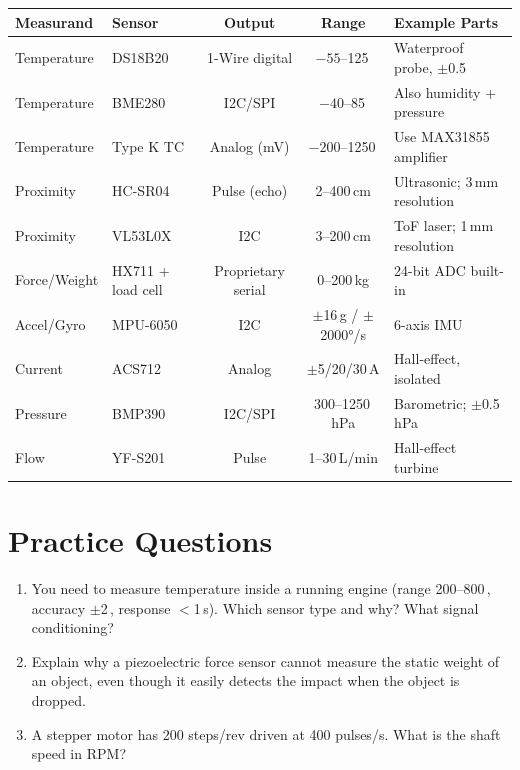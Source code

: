 \begin{quickrefbox}
\begin{table}[H]\centering\small
\begin{tabularx}{\linewidth}{l l c c X}
\toprule
\textbf{Measurand} & \textbf{Sensor} & \textbf{Output} & \textbf{Range} & \textbf{Example Parts} \\
\midrule
Temperature & DS18B20 & 1-Wire digital & $-55$--125\,\degC{} & Waterproof probe, $\pm$0.5\,\degC{} \\
Temperature & BME280 & I2C/SPI & $-40$--85\,\degC{} & Also humidity + pressure \\
Temperature & Type K TC & Analog (mV) & $-200$--1250\,\degC{} & Use MAX31855 amplifier \\
Proximity & HC-SR04 & Pulse (echo) & 2--400\,cm & Ultrasonic; 3\,mm resolution \\
Proximity & VL53L0X & I2C & 3--200\,cm & ToF laser; 1\,mm resolution \\
Force/Weight & HX711 + load cell & Proprietary serial & 0--200\,kg & 24-bit ADC built-in \\
Accel/Gyro & MPU-6050 & I2C & $\pm$16\,g / $\pm$\ang{2000}/s & 6-axis IMU \\
Current & ACS712 & Analog & $\pm$5/20/30\,A & Hall-effect, isolated \\
Pressure & BMP390 & I2C/SPI & 300--1250\,hPa & Barometric; $\pm$0.5\,hPa \\
Flow & YF-S201 & Pulse & 1--30\,L/min & Hall-effect turbine \\
\bottomrule
\end{tabularx}
\end{table}
\end{quickrefbox}

\section{Practice Questions}
\begin{enumerate}[leftmargin=1.5em]
\item You need to measure temperature inside a running engine (range 200--800\,\degC{}, accuracy $\pm$2\,\degC{}, response $<$1\,s). Which sensor type and why? What signal conditioning?
\item Explain why a piezoelectric force sensor cannot measure the static weight of an object, even though it easily detects the impact when the object is dropped.
\item A stepper motor has 200 steps/rev driven at 400 pulses/s. What is the shaft speed in RPM?
\end{enumerate}

